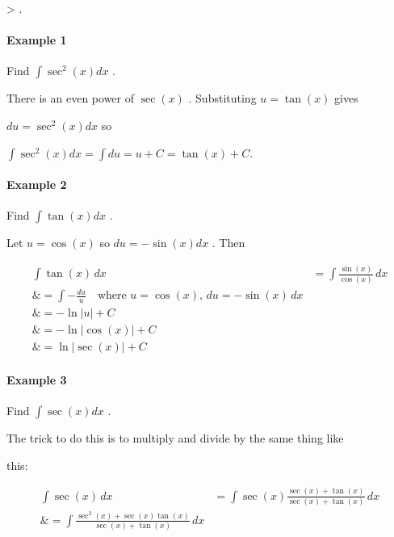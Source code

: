 >     .



\paragraph{Example 1}



Find $\int\sec^2(x)dx$ .



There is an even power of $\sec(x)$ . Substituting $u=\tan(x)$ gives

$du=\sec^2(x)dx$ so



$\int\sec^2(x)dx=\int du=u+C=\tan(x)+C.$



\paragraph{Example 2}



Find $\int\tan(x)dx$ .



Let $u=\cos(x)$ so $du=-\sin(x)dx$ . Then



\begin{align}
\int\tan(x)\,dx 

&= \int\frac{\sin(x)}{\cos(x)}\,dx \\\&= \int -\frac{du}{u} \quad \text{where } u = \cos(x), \, du = -\sin(x)\,dx \\\&= -\ln|u| + C \\\&= -\ln\Big|\cos(x)\Big| + C \\\&= \ln\Big|\sec(x)\Big| + C
\end{align}





\paragraph{Example 3}



Find $\int\sec(x)dx$ .



The trick to do this is to multiply and divide by the same thing like

this:



\begin{align}
\int\sec(x)\,dx 

&= \int\sec(x)\frac{\sec(x) + \tan(x)}{\sec(x) + \tan(x)}\,dx \\\&= \int\frac{\sec^2(x) + \sec(x)\tan(x)}{\sec(x) + \tan(x)}\,dx
\end{align}





